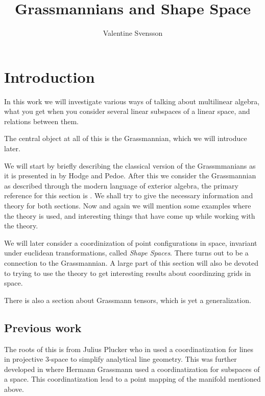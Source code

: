 \documentclass[a4paper,12pt]{book}
\theoremstyle{plain}
\theoremstyle{definition}
\begin{document}
\title{Grassmannians and Shape Space}
\author{Valentine Svensson}
\date{}

\maketitle

\tableofcontents

\chapter{Introduction} %
\label{sec:introduction} 
In this work we will
investigate various ways of talking about multilinear algebra, what you get
when you consider several linear subspaces of a linear space, and relations
between them.

The central object at all of this is the Grassmannian, which we will introduce
later.

We will start by briefly describing the classical version of the Grassmmanians
as it is presented in \cite{MR0028055} by Hodge and Pedoe. After this we
consider the Grassmannian as described through the modern language of exterior
algebra, the primary reference for this section is \cite{MR1849803}. We shall
try to give the necessary information and theory for both sections. Now and
again we will mention some examples where the theory is used, and interesting
things that have come up while working with the theory.

We will later consider a coordinization of point configurations in space,
invariant under euclidean transformations, called \emph{Shape Spaces}. There
turns out to be a connection to the Grassmannian. A large part of this section
will also be devoted to trying to use the theory to get interesting results
about coordinzing grids in space.

There is also a section about Grassmann tensors, which is yet a generalization.

\section{Previous work} %
\label{sec:previous_work}
The roots of this is from Julius Plucker who in \cite{plucker1828analytisch}
used a coordinatization for lines in projective 3-space to simplify analytical
line geometry. This was further developed in \cite{gh1844} where Hermann
Grassmann used a coordinatization for subspaces of a space. This
coordinatization lead to a point mapping of the manifold mentioned above.
\end{document}
